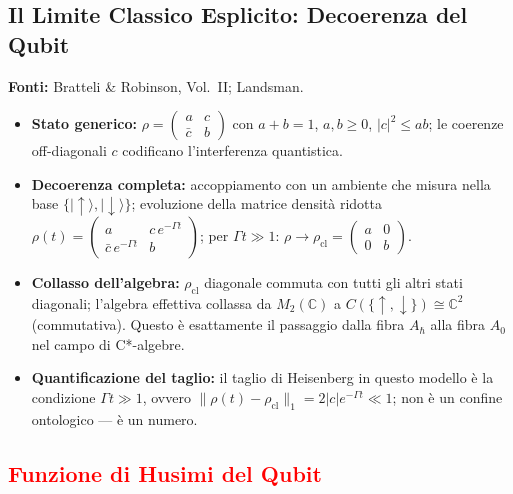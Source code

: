 \documentclass[12pt, a4paper]{article}
\newcommand{\fonti}[1]{%
	\begin{fontebox}
		\textcolor{fontecolor}{\footnotesize\textbf{Fonti:} #1}
	\end{fontebox}%
}
\begin{document}
	\subsection{Il Limite Classico Esplicito: Decoerenza del Qubit}
	
	\fonti{Bratteli \& Robinson, Vol.~II; Landsman.}
	
	\begin{itemize}
		\item \textbf{Stato generico:} $\rho = \begin{pmatrix} a & c \\ \bar{c} & b \end{pmatrix}$ con $a+b=1$, $a,b \geq 0$, $|c|^2 \leq ab$; le coerenze off-diagonali $c$ codificano l'interferenza quantistica.
		\item \textbf{Decoerenza completa:} accoppiamento con un ambiente che misura nella base $\{|\uparrow\rangle, |\downarrow\rangle\}$; evoluzione della matrice densità ridotta $\rho(t) = \begin{pmatrix} a & c\,e^{-\Gamma t} \\ \bar{c}\,e^{-\Gamma t} & b \end{pmatrix}$; per $\Gamma t \gg 1$: $\rho \to \rho_{\text{cl}} = \begin{pmatrix} a & 0 \\ 0 & b \end{pmatrix}$.
		\item \textbf{Collasso dell'algebra:} $\rho_{\text{cl}}$ diagonale commuta con tutti gli altri stati diagonali; l'algebra effettiva collassa da $M_2(\mathbb{C})$ a $C(\{{\uparrow},{\downarrow}\}) \cong \mathbb{C}^2$ (commutativa). Questo è esattamente il passaggio dalla fibra $A_\hbar$ alla fibra $A_0$ nel campo di C*-algebre.
		\item \textbf{Quantificazione del taglio:} il taglio di Heisenberg in questo modello è la condizione $\Gamma t \gg 1$, ovvero $\|\rho(t) - \rho_{\text{cl}}\|_1 = 2|c|e^{-\Gamma t} \ll 1$; non è un confine ontologico --- è un numero.
	\end{itemize}
	
	\subsection{\textcolor{red}{Funzione di Husimi del Qubit}}
	
\end{document}
